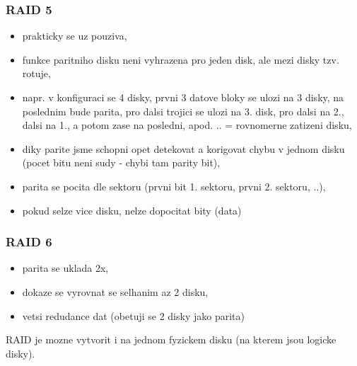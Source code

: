 \documentclass[a4paper, 11pt]{article}
\begin{document}
\subsubsection{RAID 5}
\begin{itemize}
    \item prakticky se uz pouziva,
    \item funkce paritniho disku neni vyhrazena pro jeden disk, ale mezi disky tzv. rotuje,
    \item napr. v konfiguraci se 4 disky, prvni 3 datove bloky se ulozi na 3 disky, na poslednim bude parita, pro dalsi trojici se ulozi na 3. disk, pro dalsi na 2., dalsi na 1., a potom zase na posledni, apod. .. = rovnomerne zatizeni disku,
    \item diky parite jsme schopni opet detekovat a korigovat chybu v jednom disku (pocet bitu neni sudy - chybi tam parity bit),
    \item parita se pocita dle sektoru (prvni bit 1. sektoru, prvni 2. sektoru, ..),
    \item pokud selze vice disku, nelze dopocitat bity (data) \\
\end{itemize}

\subsubsection{RAID 6}
\begin{itemize}
    \item parita se uklada 2x,
    \item dokaze se vyrovnat se selhanim az 2 disku,
    \item vetsi redudance dat (obetuji se 2 disky jako parita) \\
\end{itemize}

\noindent RAID je mozne vytvorit i na jednom fyzickem disku (na kterem jsou logicke disky).

\newpage
\end{document}
